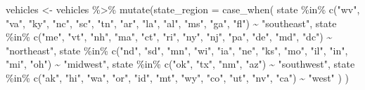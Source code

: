 \documentclass[
]{article}
\newenvironment{Shaded}{\begin{snugshade}}{\end{snugshade}}
\newcommand{\AttributeTok}[1]{\textcolor[rgb]{0.77,0.63,0.00}{#1}}
\newcommand{\FunctionTok}[1]{\textcolor[rgb]{0.00,0.00,0.00}{#1}}
\newcommand{\NormalTok}[1]{#1}
\newcommand{\OtherTok}[1]{\textcolor[rgb]{0.56,0.35,0.01}{#1}}
\newcommand{\SpecialCharTok}[1]{\textcolor[rgb]{0.00,0.00,0.00}{#1}}
\newcommand{\StringTok}[1]{\textcolor[rgb]{0.31,0.60,0.02}{#1}}
\begin{document}
\begin{Shaded}
\begin{Highlighting}[]
\NormalTok{vehicles }\OtherTok{\textless{}{-}}\NormalTok{ vehicles }\SpecialCharTok{\%\textgreater{}\%} 
  \FunctionTok{mutate}\NormalTok{(}\AttributeTok{state\_region =} 
           \FunctionTok{case\_when}\NormalTok{(}
\NormalTok{             state }\SpecialCharTok{\%in\%} \FunctionTok{c}\NormalTok{(}\StringTok{"wv"}\NormalTok{, }\StringTok{"va"}\NormalTok{, }\StringTok{"ky"}\NormalTok{, }\StringTok{"nc"}\NormalTok{, }\StringTok{"sc"}\NormalTok{, }\StringTok{"tn"}\NormalTok{, }\StringTok{"ar"}\NormalTok{, }\StringTok{"la"}\NormalTok{, }\StringTok{"al"}\NormalTok{, }\StringTok{"ms"}\NormalTok{, }\StringTok{"ga"}\NormalTok{, }\StringTok{"fl"}\NormalTok{) }\SpecialCharTok{\textasciitilde{}} \StringTok{"southeast"}\NormalTok{, }
\NormalTok{             state }\SpecialCharTok{\%in\%} \FunctionTok{c}\NormalTok{(}\StringTok{"me"}\NormalTok{, }\StringTok{"vt"}\NormalTok{, }\StringTok{"nh"}\NormalTok{, }\StringTok{"ma"}\NormalTok{, }\StringTok{"ct"}\NormalTok{, }\StringTok{"ri"}\NormalTok{, }\StringTok{"ny"}\NormalTok{, }\StringTok{"nj"}\NormalTok{, }\StringTok{"pa"}\NormalTok{, }\StringTok{"de"}\NormalTok{, }\StringTok{"md"}\NormalTok{, }\StringTok{"dc"}\NormalTok{) }\SpecialCharTok{\textasciitilde{}} \StringTok{"northeast"}\NormalTok{, }
\NormalTok{             state }\SpecialCharTok{\%in\%} \FunctionTok{c}\NormalTok{(}\StringTok{"nd"}\NormalTok{, }\StringTok{"sd"}\NormalTok{, }\StringTok{"mn"}\NormalTok{, }\StringTok{"wi"}\NormalTok{, }\StringTok{"ia"}\NormalTok{, }\StringTok{"ne"}\NormalTok{, }\StringTok{"ks"}\NormalTok{, }\StringTok{"mo"}\NormalTok{, }\StringTok{"il"}\NormalTok{, }\StringTok{"in"}\NormalTok{, }\StringTok{"mi"}\NormalTok{, }\StringTok{"oh"}\NormalTok{) }\SpecialCharTok{\textasciitilde{}} \StringTok{"midwest"}\NormalTok{, }
\NormalTok{             state }\SpecialCharTok{\%in\%} \FunctionTok{c}\NormalTok{(}\StringTok{"ok"}\NormalTok{, }\StringTok{"tx"}\NormalTok{, }\StringTok{"nm"}\NormalTok{, }\StringTok{"az"}\NormalTok{) }\SpecialCharTok{\textasciitilde{}} \StringTok{"southwest"}\NormalTok{, }
\NormalTok{             state }\SpecialCharTok{\%in\%} \FunctionTok{c}\NormalTok{(}\StringTok{"ak"}\NormalTok{, }\StringTok{"hi"}\NormalTok{, }\StringTok{"wa"}\NormalTok{, }\StringTok{"or"}\NormalTok{, }\StringTok{"id"}\NormalTok{, }\StringTok{"mt"}\NormalTok{, }\StringTok{"wy"}\NormalTok{, }\StringTok{"co"}\NormalTok{, }\StringTok{"ut"}\NormalTok{, }\StringTok{"nv"}\NormalTok{, }\StringTok{"ca"}\NormalTok{) }\SpecialCharTok{\textasciitilde{}} \StringTok{"west"}
\NormalTok{           )}
\NormalTok{  )}
\end{Highlighting}
\end{Shaded}
\end{document}

